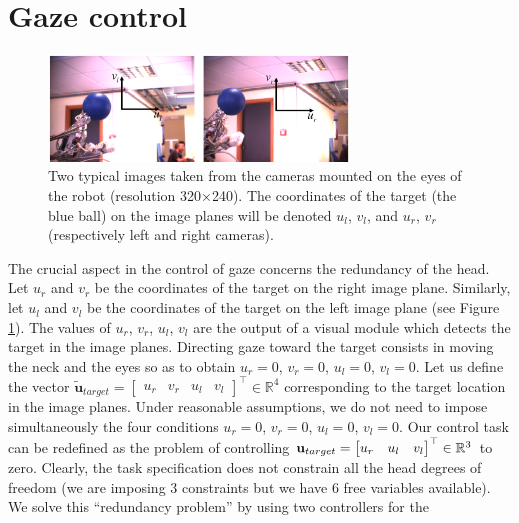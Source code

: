 \section{Gaze control}
\label{Sec:gazecontrol}

%
\begin{figure}[tbp]
\centering
\includegraphics[width=8cm]{Figure/hand.eps}
\caption{Two typical images taken from the cameras mounted on the 
eyes of the robot (resolution 320$\times$240).
The coordinates of the target (the blue ball) on the image planes
will be denoted $u_l$, $v_l$, and $u_r$, $v_r$ (respectively left 
and right cameras).}
\label{Fig:ImagePlane}
\end{figure}
% 
The crucial aspect in the control of gaze concerns the redundancy of the 
head. Let $u_r$ and $v_r$ be the coordinates of the target on the 
right image plane. Similarly, let $u_l$ and $v_l$ be the coordinates 
of the target on the 
left image plane (see Figure \ref{Fig:ImagePlane}). The values of $u_r$, 
$v_r$, $u_l$, $v_l$ are the output of a visual module which detects the
target in the image planes. Directing gaze 
toward the target 
consists in moving the neck and the eyes so as to obtain 
$u_r=0$, $v_r=0$, $u_l=0$, $v_l=0$. 
Let us define the vector 
$\tilde {\mathbf u}_{target}= \begin{bmatrix} u_r & v_r & u_l & v_l 
\end{bmatrix}^\top \in \mathbb R^4$ corresponding to the 
target location in the image planes. Under reasonable 
assumptions, we do not need to impose simultaneously 
the four conditions $u_r=0$, $v_r=0$, $u_l=0$, $v_l=0$.  Our control task 
can be redefined as the problem of controlling 
$\mathbf{u}_{target} = \begin{bmatrix} u_r & u_l & v_l \end{bmatrix}^\top \in \mathbb R^3$ 
to zero. Clearly, the task specification does not constrain all the head 
degrees of freedom (we are imposing $3$ constraints but we 
have $6$ free variables available). 
We solve this ``redundancy problem'' by using two controllers for the 
